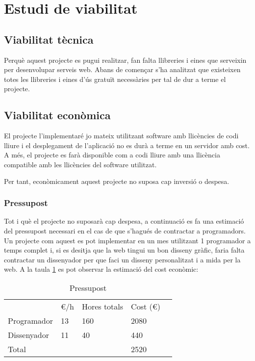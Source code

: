\documentclass[12pt, titlepage]{article}
\begin{document}
\section{Estudi de viabilitat}

\subsection{Viabilitat tècnica}
Perquè aquest projecte es pugui realitzar, fan falta llibreries i eines que
serveixin per desenvolupar serveis web. Abans de començar s'ha analitzat que
existeixen totes les llibreries i eines d'ús gratuït necessàries per tal de
dur a terme el projecte.

\subsection{Viabilitat econòmica}
El projecte l'implementaré jo mateix utilitzant software amb llicències de codi
lliure i el desplegament de l'aplicació no es durà a terme en un servidor amb cost.
A més, el projecte es farà disponible com a codi lliure amb una llicència
compatible amb les llicències del software utilitzat.

Per tant, econòmicament aquest projecte no suposa cap inversió o despesa.

\subsubsection{Pressupost}

Tot i què el projecte no suposarà cap despesa, a continuació es fa una estimació 
del pressupost necessari en el cas de que s'hagués de contractar a programadors.
Un projecte com aquest es pot implementar en un mes utilitzant 1 programador a 
temps complet i, si es desitja que la web tingui un bon disseny gràfic,
faria falta contractar un dissenyador per que faci un disseny personalitzat
i a mida per la web. A la taula \ref{pressupost} es pot observar la estimació del cost 
econòmic:

\begin{table}[H]
\centering
\caption{Pressupost}
\label{pressupost}
\begin{tabular}{|l|l|l|l|l}
\cline{1-4}
            & €/h & Hores totals & Cost (€) &  \\ \cline{1-4}
Programador & 13  & 160           & 2080 &  \\ \cline{1-4}
Dissenyador & 11  & 40            & 440  &  \\ \cline{1-4}
Total       &     &              & 2520 &  \\ \cline{1-4}
\end{tabular}
\end{table}
\end{document}

